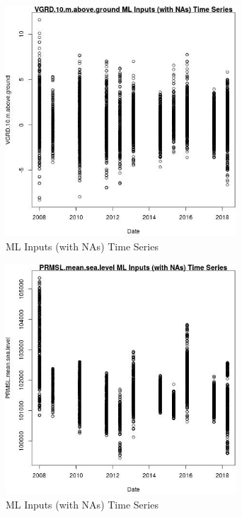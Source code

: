 \begin{figure} 
\centering  
\includegraphics[width=0.77\textwidth]{Code_Outputs/Report_ML_input_PM25_Step4_part_e_de_duplicated_aves_compiled_2019-05-18wNAs_VGRD10mabovegroundvDate.jpg} 
\caption{\label{fig:Report_ML_input_PM25_Step4_part_e_de_duplicated_aves_compiled_2019-05-18wNAsVGRD10mabovegroundvDate}ML Inputs (with NAs) Time Series} 
\end{figure} 
 

\begin{figure} 
\centering  
\includegraphics[width=0.77\textwidth]{Code_Outputs/Report_ML_input_PM25_Step4_part_e_de_duplicated_aves_compiled_2019-05-18wNAs_PRMSLmeansealevelvDate.jpg} 
\caption{\label{fig:Report_ML_input_PM25_Step4_part_e_de_duplicated_aves_compiled_2019-05-18wNAsPRMSLmeansealevelvDate}ML Inputs (with NAs) Time Series} 
\end{figure} 
 

